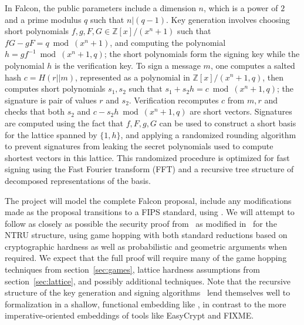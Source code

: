 In Falcon, the public parameters include a dimension $n$, which is a power of $2$ and a prime modulus $q$ such that $n | (q-1)$.  Key generation involves choosing short polynomials $f,g,F,G \in \mathbb{Z}[x]/(x^n+1)$ such that $fG-gF = q \bmod (x^n+1)$, and computing the polynomial $h=gf^{-1} \bmod (x^n+1,q)$; the short polynomials form the signing key while the polynomial $h$ is the verification key.
To sign a message $m$, one computes a salted hash $c = H(r||m)$, represented as a polynomial in $\mathbb{Z}[x]/(x^n+1,q)$, then computes short polynomials $s_1,s_2$ such that $s_1 + s_2h = c \bmod (x^n+1,q)$; the signature is pair of values $r$ and $s_2$.
Verification recomputes $c$ from $m,r$ and checks that both $s_2$ and $c-s_2h \bmod (x^n+1,q)$ are short vectors.
Signatures are computed using the fact that $f,F,g,G$ can be used to construct a short basis for the lattice spanned by $\{1,h\}$, and applying a randomized rounding algorithm to prevent signatures from leaking the secret polynomials used to compute shortest vectors in this lattice.
This randomized procedure is optimized for fast signing using the Fast Fourier transform (FFT) and a recursive tree structure of decomposed representations of the basis.

The project will model the complete Falcon proposal, include any modifications made as the proposal transitions to a FIPS standard, using \vcvio.  We will attempt to follow as closely as possible the security proof from~\cite{GPV} as modified in~\cite{fouque2018falcon} for the NTRU structure, using game hopping with both standard reductions based on cryptographic hardness as well as probabilistic and geometric arguments when required.
We expect that the full proof will require many of the game hopping techniques from section~\ref{sec:games}, lattice hardness assumptions from section~\ref{sec:lattice}, and possibly additional techniques.
Note that the recursive structure of the key generation and signing algorithms~\cite{fouque2018falcon} lend themselves well to formalization in a shallow, functional embedding like \vcvio, in contrast to the more imperative-oriented embeddings of tools like EasyCrypt and FIXME.



